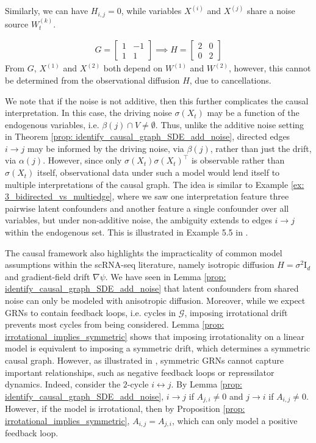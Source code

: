 \documentclass[twoside,11pt]{article}
\newcommand{\Id}{\mathrm{I}_d}
\begin{document}
Similarly, we can have $H_{i,j}=0$, while variables $X^{(i)}$ and $X^{(j)}$ share a noise source $W_t^{(k)}$.
\begin{ex}
\label{ex: cancellation_for_pairwise_latents}
\begin{align*}
G=\begin{bmatrix}
    1 & -1 \\
    1 & 1
\end{bmatrix} \implies H = \begin{bmatrix}
    2 & 0 \\
    0 & 2
\end{bmatrix}
\end{align*}
From $G$, $X^{(1)}$ and $X^{(2)}$ both depend on $W^{(1)}$ and $W^{(2)}$, however, this cannot be determined from the observational diffusion $H$, due to cancellations.
\end{ex}


We note that if the noise is not additive, then this further complicates the causal interpretation. In this case, the driving noise $\sigma(X_t)$ may be a function of the endogenous variables, i.e. $\beta(j) \cap V \neq \emptyset$. Thus, unlike the additive noise setting in Theorem \ref{prop: identify_causal_graph_SDE_add_noise}, directed edges $i \to j$ may be informed by the driving noise, via $\beta(j)$, rather than just the drift, via $\alpha(j)$. However, since only $\sigma(X_t)\sigma(X_t)^\top $ is observable rather than $\sigma(X_t)$ itself, observational data under such a model would lend itself to multiple interpretations of the causal graph. The idea is similar to Example \ref{ex: 3_bidirected_vs_multiedge}, where we saw one interpretation feature three pairwise latent confounders and another feature a single confounder over all variables, but under non-additive noise, the ambiguity extends to edges $i \to j$ within the endogenous set. This is illustrated in Example 5.5 in \citet{hansen2014causal}.


The causal framework also highlights the impracticality of common model assumptions within the scRNA-seq literature, namely isotropic diffusion $H=\sigma^2 \Id$ and gradient-field drift $\nabla \psi$. We have seen in Lemma \ref{prop: identify_causal_graph_SDE_add_noise} that latent confounders from shared noise can only be modeled with anisotropic diffusion. Moreover, while we expect GRNs to contain feedback loops, i.e. cycles in $\mathcal{G}$, imposing irrotational drift prevents most cycles from being considered. Lemma \ref{prop: irrotational_implies_symmetric} shows that imposing irrotationality on a linear model is equivalent to imposing a symmetric drift, which determines a symmetric causal graph. However, as illustrated in \citet[Fig. 6]{weinreb2018fundamental}, symmetric GRNs cannot capture important relationships, such as negative feedback loops or repressilator dynamics. Indeed, consider the $2$-cycle $i \leftrightarrow j$. By Lemma \ref{prop: identify_causal_graph_SDE_add_noise}, $i \to j$ if $A_{j,i} \neq 0$ and  $j \to i$ if $A_{i,j} \neq 0$. However, if the model is irrotational, then by Proposition \ref{prop: irrotational_implies_symmetric}, $A_{i,j} = A_{j,i}$, which can only model a positive feedback loop.
\end{document}
